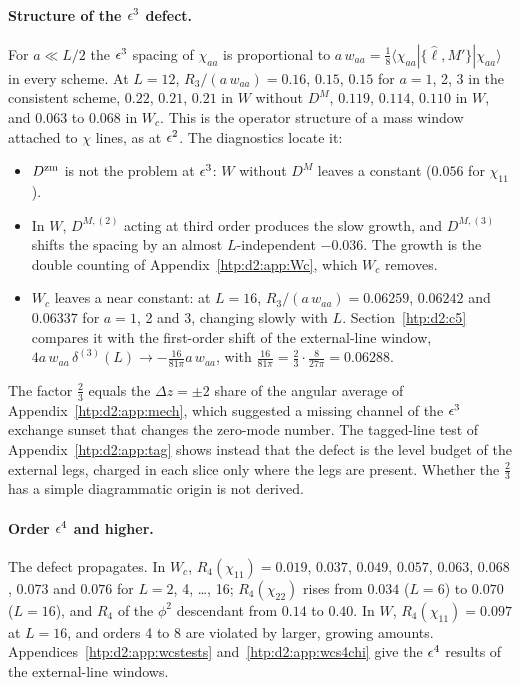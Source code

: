 \paragraph{Structure of the $\epsilon^3$ defect.} For $a\ll L/2$ the $\epsilon^3$ spacing of $\chi_{aa}$ is proportional to
$a\,w_{aa}=\frac18\langle\chi_{aa}|\{\hat\ell,M'\}|\chi_{aa}\rangle$ in every scheme. At $L=12$, $R_3/(a\,w_{aa})=0.16$, $0.15$,
$0.15$ for $a=1$, 2, 3 in the consistent scheme, $0.22$, $0.21$, $0.21$ in $W$ without $D^M$, $0.119$, $0.114$, $0.110$ in $W$,
and $0.063$ to $0.068$ in $W_c$. This is the operator structure of a mass window attached to $\chi$ lines, as at $\epsilon^2$. The
diagnostics locate it:
\begin{itemize}
\item $D^{\rm zm}$ is not the problem at $\epsilon^3$: $W$ without $D^M$ leaves a constant ($0.056$ for $\chi_{11}$).
\item In $W$, $D^{M,(2)}$ acting at third order produces the slow growth, and $D^{M,(3)}$ shifts the spacing by an almost
 $L$-independent $-0.036$. The growth is the double counting of Appendix~\ref{htp:d2:app:Wc}, which $W_c$ removes.
\item $W_c$ leaves a near constant: at $L=16$, $R_3/(a\,w_{aa})=0.06259$, $0.06242$ and $0.06337$ for $a=1$, 2 and 3,
 changing slowly with $L$. Section~\ref{htp:d2:c5} compares it with the first-order shift of the external-line window,
 $4a\,w_{aa}\,\delta^{(3)}(L)\to-\frac{16}{81\pi}a\,w_{aa}$, with $\frac{16}{81\pi}=\frac23\cdot\frac8{27\pi}=0.06288$.
\end{itemize}
The factor $\frac23$ equals the $\Delta z=\pm2$ share of the angular average of Appendix~\ref{htp:d2:app:mech}, which suggested a
missing channel of the $\epsilon^3$ exchange sunset that changes the zero-mode number. The tagged-line test of
Appendix~\ref{htp:d2:app:tag} shows instead that the defect is the level budget of the external legs, charged in each slice only
where the legs are present. Whether the $\frac23$ has a simple diagrammatic origin is not derived.

\paragraph{Order $\epsilon^4$ and higher.} The defect propagates. In $W_c$, $R_4(\chi_{11})=0.019$, $0.037$, $0.049$, $0.057$,
$0.063$, $0.068$, $0.073$ and $0.076$ for $L=2$, 4, \dots, 16; $R_4(\chi_{22})$ rises from $0.034$ ($L=6$) to $0.070$ ($L=16$), and
$R_4$ of the $\phi^2$ descendant from $0.14$ to $0.40$. In $W$, $R_4(\chi_{11})=0.097$ at $L=16$, and orders 4 to 8 are
violated by larger, growing amounts. Appendices~\ref{htp:d2:app:wcstests} and~\ref{htp:d2:app:wcs4chi} give the $\epsilon^4$ results of
the external-line windows.

